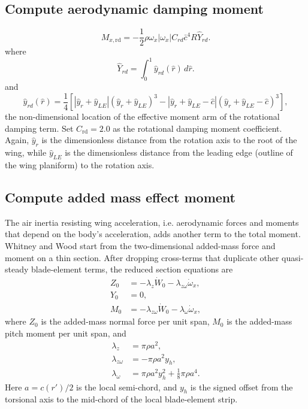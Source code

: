 \documentclass{article}
\begin{document}
\subsection{Compute aerodynamic damping moment} 
\begin{equation}
    M_{x, \mathrm{rd}} = -\frac{1}{2} \rho \omega_x |\omega_x| C_{rd} \bar{c}^{4} R \hat{Y}_{rd}. 
\end{equation}
where
\begin{equation}
\hat{Y}_{rd}
=
\int_0^1 \hat{y}_{rd}(\hat{r})\,d\hat{r}.
\end{equation}
and 
\begin{equation}
\hat{y}_{rd}(\hat{r})
=
\frac{1}{4}
\left[
\left|\hat{y}_r + \hat{y}_{LE}\right|
\left(\hat{y}_r + \hat{y}_{LE}\right)^3
-
\left|\hat{y}_r + \hat{y}_{LE} - \hat{c}\right|
\left(\hat{y}_r + \hat{y}_{LE} - \hat{c}\right)^3
\right],
\end{equation}
the non-dimensional location of the effective moment arm of the rotational damping term. 
Set \(C_{\mathrm{rd}} = 2.0\) as the rotational damping moment coefficient. Again, \(\hat{y}_r\) is the dimensionless distance from the rotation axis to the root of the wing, while \(\hat{y}_{LE}\) is the dimensionless distance from the leading edge (outline of the wing planiform) to the rotation axis.

\subsection{Compute added mass effect moment}
The air inertia resisting wing acceleration, i.e. aerodynamic forces and moments that depend on the body's acceleration, adds another term to the total moment. Whitney and Wood start from the two-dimensional added-mass force and moment on a thin section. After dropping cross-terms that duplicate other quasi-steady blade-element terms, the reduced section equations are
\begin{align}
Z_0 &= -\lambda_z \dot{W}_0 - \lambda_{z\omega}\dot{\omega}_x, \\
Y_0 &= 0, \\
M_0 &= -\lambda_{z\omega}\dot{W}_0 - \lambda_{\omega}\dot{\omega}_x,
\end{align}
where \(Z_0\) is the added-mass normal force per unit span, \(M_0\) is the added-mass pitch moment per unit span, and
\begin{align}
\lambda_z &= \pi \rho a^2, \\
\lambda_{z\omega} &= -\pi \rho a^2 y_h, \\
\lambda_{\omega} &= \pi \rho a^2 y_h^2 + \frac{1}{8}\pi\rho a^4.
\end{align}
Here \(a=c(r')/2\) is the local semi-chord, and \(y_h\) is the signed offset from the torsional axis to the mid-chord of the local blade-element strip.
\end{document}
